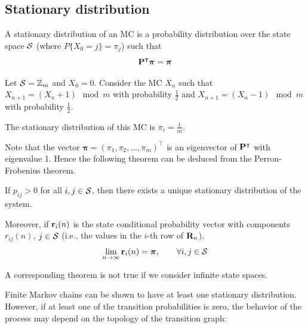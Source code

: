 \subsection{Stationary distribution}

\begin{definition}
A stationary distribution of an MC is a probability distribution over the state space ${\cal S}$ (where $P\{X_0=j\} = \pi_j$) such that
\begin{equation}
\label{sp:mc_stat_def}
{\bf P}^\intercal \bm{\pi} = \bm{\pi}
\end{equation}

\end{definition}

\begin{example}
Let ${\cal S} = \mathbb{Z}_m$ and $X_0=0$. Consider the MC $X_n$ such that $X_{n+1}=(X_n+1) \mod m$ with probability $\frac12$ and $X_{n+1} = (X_n-1) \mod  m$ with probability $\frac12$.

The stationary distribution of this MC is $\pi_i = \frac1m$.
\end{example}

Note that the vector $\bm{\pi} = (\pi_1, \pi_2, \ldots , \pi_m)^\intercal$ is an eigenvector of ${\bf P}^\intercal$ with eigenvalue 1. Hence the following theorem can be deduced from the Perron-Frobenius theorem.

\begin{theorem}
If $p_{ij} > 0$ for all $i, j \in {\cal S}$, then there exists a unique stationary distribution of the system. 

Moreover, if ${\bf r}_i(n)$ is the state conditional probability vector with components $r_{ij}(n)$, $j \in {\cal S}$ (i.e., the values in the $i$-th row of ${\bf R}_n$),
\begin{align}
\lim_{n \rightarrow \infty} {\bf r}_i(n) = \bm{\pi}, \qquad \forall i, j \in {\cal S}
\end{align}
\end{theorem}

A corresponding theorem is not true if we consider infinite state spaces.

Finite Markov chains can be shown to have at least one stationary distribution. However, if at least one of the transition probabilities is zero, the behavior of the process may depend on the topology of the transition graph:

